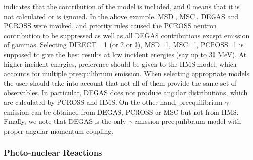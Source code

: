  indicates that the contribution of the model is included, and 0
means that it is not calculated or is ignored. In the above example, MSD%
, MSC%
, DEGAS%
 and PCROSS%
 were invoked, and priority rules caused the PCROSS neutron
contribution to be suppressed as well as all DEGAS contributions except
emission of gammas. Selecting DIRECT =1 (or 2 or 3), MSD=1, MSC=1, PCROSS=1
is supposed to give the best results at low incident energies (say up to 30
MeV). At higher incident energies, preference should be given to the HMS%
 model, which accounts for multiple preequilibrium emission.
When selecting appropriate models the user should take into account that not
all of them provide the same set of observables. In particular, DEGAS%
 does not produce angular distributions,
which are calculated by
PCROSS and HMS. On the other hand, preequilibrium $\gamma$-emission can be
obtained from DEGAS, PCROSS or MSC but not from HMS. Finally, we note that
DEGAS is the only $\gamma$-emission preequilibrium model with proper angular
momentum coupling.

\subsubsection{\label{sec:photonuclear} Photo-nuclear Reactions}

